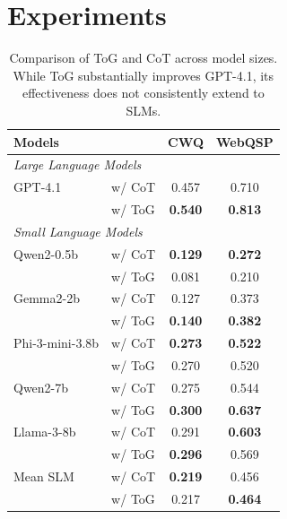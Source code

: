 \documentclass[11pt]{article}
\begin{document}
\section{Experiments}


\begin{table}
  \centering
  \begin{tabular}{llcc}
    \toprule
    \bf Models & & \bf CWQ & \bf WebQSP \\
    \midrule
    \multicolumn{3}{l}{\it Large Language Models} \\
    GPT-4.1 & w/ CoT & 0.457 & 0.710 \\
     & w/ ToG & \textbf{0.540} & \textbf{0.813} \\ 
\midrule
    \multicolumn{3}{l}{\it Small Language Models} \\
    Qwen2-0.5b & w/ CoT & \textbf{0.129} & \textbf{0.272} \\
    & w/ ToG & 0.081 & 0.210 \\ 
    Gemma2-2b & w/ CoT & 0.127 & 0.373 \\
    & w/ ToG & \textbf{0.140} & \textbf{0.382} \\ 
    Phi-3-mini-3.8b& w/ CoT & \textbf{0.273} & \textbf{0.522} \\
    & w/ ToG & 0.270 & 0.520 \\ 
    Qwen2-7b & w/ CoT & 0.275 & 0.544 \\
    & w/ ToG & \textbf{0.300} & \textbf{0.637} \\ 
    Llama-3-8b& w/ CoT & 0.291 & \textbf{0.603} \\
    & w/ ToG & \textbf{0.296} & 0.569 \\ 
    Mean SLM & w/ CoT & \textbf{0.219} & 0.456\\
     & w/ ToG & 0.217 & \textbf{0.464} \\ 
\bottomrule
    
  \end{tabular}
  \caption{Comparison of ToG and CoT across model sizes. While ToG substantially improves GPT-4.1, its effectiveness does not consistently extend to SLMs.}
  \label{tab:cotvstog}
\end{table}
\end{document}
